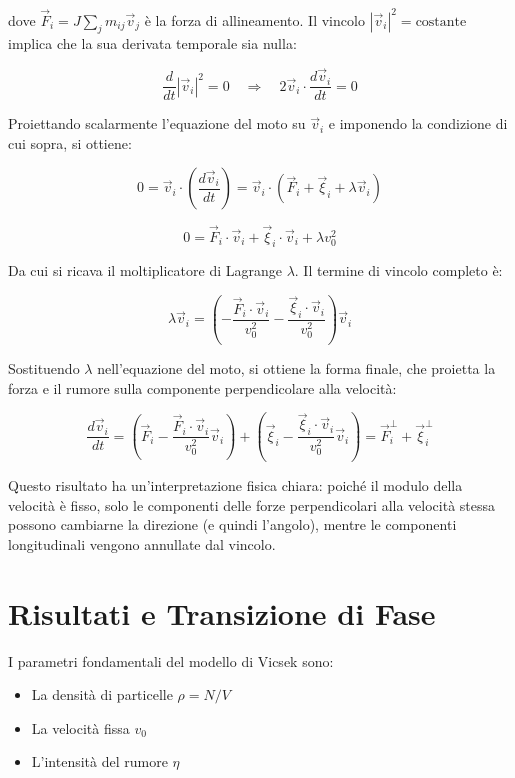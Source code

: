dove $\vec{F}_i = J\sum_{j}m_{ij}\vec{v}_j$ è la forza di allineamento. Il vincolo $|\vec{v}_i|^2 = \text{costante}$ implica che la sua derivata temporale sia nulla:

\begin{equation} \label{eq:ch27_30}
\frac{d}{dt}|\vec{v}_i|^2 = 0 \quad \Rightarrow \quad 2\vec{v}_i \cdot \frac{d\vec{v}_i}{dt} = 0
\end{equation}

Proiettando scalarmente l'equazione del moto su $\vec{v}_i$ e imponendo la condizione di cui sopra, si ottiene:

\begin{equation} \label{eq:ch27_31}
0 = \vec{v}_i \cdot \left( \frac{d\vec{v}_i}{dt} \right) = \vec{v}_i \cdot (\vec{F}_i + \vec{\xi}_i + \lambda \vec{v}_i)
\end{equation}

\begin{equation} \label{eq:ch27_32}
0 = \vec{F}_i \cdot \vec{v}_i + \vec{\xi}_i \cdot \vec{v}_i + \lambda v_0^2
\end{equation}

Da cui si ricava il moltiplicatore di Lagrange $\lambda$. Il termine di vincolo completo è:

\begin{equation} \label{eq:ch27_33}
\lambda \vec{v}_i = \left( -\frac{\vec{F}_i \cdot \vec{v}_i}{v_0^2} - \frac{\vec{\xi}_i \cdot \vec{v}_i}{v_0^2} \right) \vec{v}_i
\end{equation}

Sostituendo $\lambda$ nell'equazione del moto, si ottiene la forma finale, che proietta la forza e il rumore sulla componente perpendicolare alla velocità:

\begin{equation} \label{eq:ch27_34}
\frac{d\vec{v}_i}{dt} = \left( \vec{F}_i - \frac{\vec{F}_i \cdot \vec{v}_i}{v_0^2}\vec{v}_i \right) + \left( \vec{\xi}_i - \frac{\vec{\xi}_i \cdot \vec{v}_i}{v_0^2}\vec{v}_i \right) = \vec{F}_{i}^{\perp} + \vec{\xi}_{i}^{\perp}
\end{equation}

Questo risultato ha un'interpretazione fisica chiara: poiché il modulo della velocità è fisso, solo le componenti delle forze perpendicolari alla velocità stessa possono cambiarne la direzione (e quindi l'angolo), mentre le componenti longitudinali vengono annullate dal vincolo.


\section{Risultati e Transizione di Fase}
I parametri fondamentali del modello di Vicsek sono:
\begin{itemize}
    \item La densità di particelle $\rho = N/V$
    \item La velocità fissa $v_0$
    \item L'intensità del rumore $\eta$
\end{itemize}

